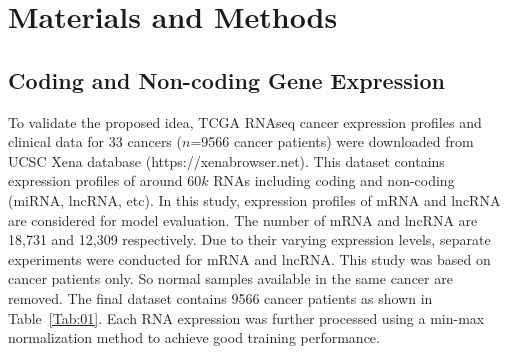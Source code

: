 \documentclass{bioinfo}
\begin{document}
\section{Materials and Methods}
\subsection{Coding and Non-coding Gene Expression}
To validate the proposed idea, TCGA RNAseq cancer expression profiles and clinical data for $33$ cancers ($n$=9566 cancer patients) were downloaded from UCSC Xena database (https://xenabrowser.net). 
This dataset contains expression profiles of around $60k$ RNAs including coding and non-coding (miRNA, lncRNA, etc). In this study, expression profiles of mRNA and lncRNA are considered for model evaluation. The number of mRNA and lncRNA are 18,731 and 12,309 respectively. Due to their varying expression levels, separate experiments were conducted for mRNA and lncRNA. This study was based on cancer patients only. So normal samples available in the same cancer are removed. The final dataset contains 9566 cancer patients as shown in Table~\ref{Tab:01}. Each RNA expression was further processed using a min-max normalization method to achieve good training performance. 
\end{document}
